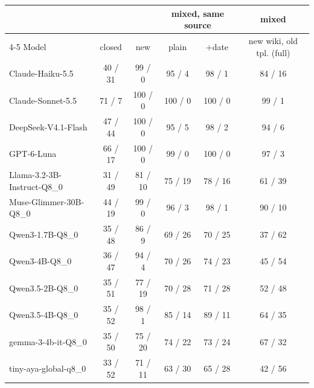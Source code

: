 \begin{tabular}{@{}l ccccc@{}}
\toprule
 & & & \multicolumn{2}{c}{mixed, same source} & mixed \\
\cmidrule(lr){4-5}
Model & closed & new & plain & +date & new wiki, old tpl. (full) \\
\midrule
Claude-Haiku-5.5 & 40 / 31 & 99 / 0 & 95 / 4 & 98 / 1 & 84 / 16 \\
Claude-Sonnet-5.5 & 71 / 7 & 100 / 0 & 100 / 0 & 100 / 0 & 99 / 1 \\
DeepSeek-V4.1-Flash & 47 / 44 & 100 / 0 & 95 / 5 & 98 / 2 & 94 / 6 \\
GPT-6-Luna & 66 / 17 & 100 / 0 & 99 / 0 & 100 / 0 & 97 / 3 \\
Llama-3.2-3B-Instruct-Q8\_0 & 31 / 49 & 81 / 10 & 75 / 19 & 78 / 16 & 61 / 39 \\
Muse-Glimmer-30B-Q8\_0 & 44 / 19 & 99 / 0 & 96 / 3 & 98 / 1 & 90 / 10 \\
Qwen3-1.7B-Q8\_0 & 35 / 48 & 86 / 9 & 69 / 26 & 70 / 25 & 37 / 62 \\
Qwen3-4B-Q8\_0 & 36 / 47 & 94 / 4 & 70 / 26 & 74 / 23 & 45 / 54 \\
Qwen3.5-2B-Q8\_0 & 35 / 51 & 77 / 19 & 70 / 28 & 71 / 28 & 52 / 48 \\
Qwen3.5-4B-Q8\_0 & 35 / 52 & 98 / 1 & 85 / 14 & 89 / 11 & 64 / 35 \\
gemma-3-4b-it-Q8\_0 & 35 / 50 & 75 / 20 & 74 / 22 & 73 / 24 & 67 / 32 \\
tiny-aya-global-q8\_0 & 33 / 52 & 71 / 11 & 63 / 30 & 65 / 28 & 42 / 56 \\
\bottomrule
\end{tabular}
